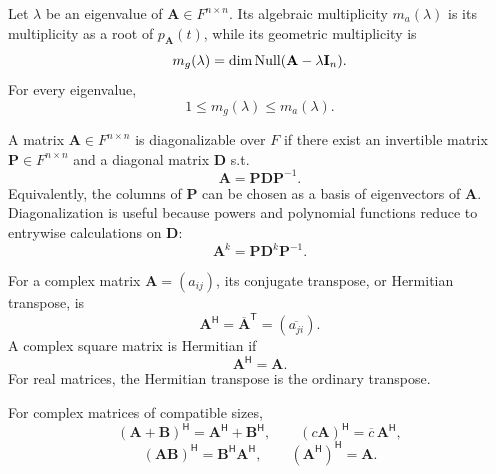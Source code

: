     \begin{definition}
        Let $\lambda$ be an eigenvalue of $\mathbf{A}\in F^{n\times n}$.
        Its algebraic multiplicity $m_a(\lambda)$ is its multiplicity as a root
        of $p_{\mathbf{A}}(t)$, while its geometric multiplicity is
        \[
            m_g(\lambda)
            =
            \dim\operatorname{Null}(\mathbf{A}-\lambda\mathbf{I}_n).
        \]
        For every eigenvalue,
        \[
            1\leq m_g(\lambda)\leq m_a(\lambda).
        \]
    \end{definition}

    \begin{definition}
        A matrix $\mathbf{A}\in F^{n\times n}$ is diagonalizable over $F$ if
        there exist an invertible matrix $\mathbf{P}\in F^{n\times n}$ and a
        diagonal matrix $\mathbf{D}$ s.t.
        \[
            \mathbf{A}=\mathbf{P}\mathbf{D}\mathbf{P}^{-1}.
        \]
        Equivalently, the columns of $\mathbf{P}$ can be chosen as a basis of
        eigenvectors of $\mathbf{A}$. Diagonalization is useful because powers
        and polynomial functions reduce to entrywise calculations on
        $\mathbf{D}$:
        \[
            \mathbf{A}^k=\mathbf{P}\mathbf{D}^k\mathbf{P}^{-1}.
        \]
    \end{definition}

    \begin{definition}
        For a complex matrix $\mathbf{A}=(a_{ij})$, its conjugate transpose, or
        Hermitian transpose, is
        \[
            \mathbf{A}^{\mathsf H}
            =
            \overline{\mathbf{A}}^{\mathsf T}
            =
            (\overline{a_{ji}}).
        \]
        A complex square matrix is Hermitian if
        \[
            \mathbf{A}^{\mathsf H}=\mathbf{A}.
        \]
        For real matrices, the Hermitian transpose is the ordinary transpose.
    \end{definition}

    \begin{proposition}
        For complex matrices of compatible sizes,
        \[
            (\mathbf{A}+\mathbf{B})^{\mathsf H}
            =
            \mathbf{A}^{\mathsf H}+\mathbf{B}^{\mathsf H},
            \qquad
            (c\mathbf{A})^{\mathsf H}
            =
            \overline{c}\,\mathbf{A}^{\mathsf H},
        \]
        \[
            (\mathbf{A}\mathbf{B})^{\mathsf H}
            =
            \mathbf{B}^{\mathsf H}\mathbf{A}^{\mathsf H},
            \qquad
            (\mathbf{A}^{\mathsf H})^{\mathsf H}
            =
            \mathbf{A}.
        \]
    \end{proposition}

